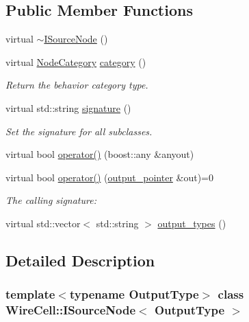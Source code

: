 \subsection*{Public Member Functions}
\begin{DoxyCompactItemize}
\item 
virtual \hyperlink{class_wire_cell_1_1_i_source_node_ad7061b2d026afe5e8ba14c85e5607b19}{$\sim$\+I\+Source\+Node} ()
\item 
virtual \hyperlink{class_wire_cell_1_1_i_node_a5546e64cbb70bd3ac787295cac9ac803}{Node\+Category} \hyperlink{class_wire_cell_1_1_i_source_node_a1742b49fa591d01cd209ed027a7d29ba}{category} ()
\begin{DoxyCompactList}\small\item\em Return the behavior category type. \end{DoxyCompactList}\item 
virtual std\+::string \hyperlink{class_wire_cell_1_1_i_source_node_a9361f7cad35e087800c5e59f27939977}{signature} ()
\begin{DoxyCompactList}\small\item\em Set the signature for all subclasses. \end{DoxyCompactList}\item 
virtual bool \hyperlink{class_wire_cell_1_1_i_source_node_a4d3f01222148f2787b6097cf8c8e1905}{operator()} (boost\+::any \&anyout)
\item 
virtual bool \hyperlink{class_wire_cell_1_1_i_source_node_a945b2cc60a731bee93a7c2a1dfa0d7c3}{operator()} (\hyperlink{class_wire_cell_1_1_i_source_node_ae2743237513016d7f69d68aac1104951}{output\+\_\+pointer} \&out)=0
\begin{DoxyCompactList}\small\item\em The calling signature\+: \end{DoxyCompactList}\item 
virtual std\+::vector$<$ std\+::string $>$ \hyperlink{class_wire_cell_1_1_i_source_node_a37037cdba0b75cf5fa50751000a4f436}{output\+\_\+types} ()
\end{DoxyCompactItemize}


\subsection{Detailed Description}
\subsubsection*{template$<$typename Output\+Type$>$\newline
class Wire\+Cell\+::\+I\+Source\+Node$<$ Output\+Type $>$}



